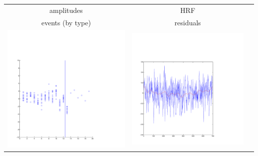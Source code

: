 \documentclass{beamer}
\begin{document}
\begin{frame}
\begin{tabular}{ccc}
amplitudes & HRF\\
events (by type) & residuals\\
\includegraphics[scale=0.12]{ex2_data1c.pdf} &
 \includegraphics[scale=0.12]{ex2_data1r.pdf}
\end{tabular}
\end{frame}
\end{document}
